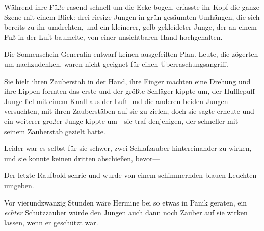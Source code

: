 Während ihre Füße rasend schnell um die Ecke bogen, erfasste ihr Kopf die ganze Szene mit einem Blick: drei riesige Jungen in grün-gesäumten Umhängen, die sich bereits zu ihr umdrehten, und ein kleinerer, gelb gekleideter Junge, der an einem Fuß in der Luft baumelte, von einer unsichtbaren Hand hochgehalten.

Die Sonnenschein-Generalin entwarf keinen ausgefeilten Plan. Leute, die zögerten um nachzudenken, waren nicht geeignet für einen Überraschungsangriff.

Sie hielt ihren Zauberstab in der Hand, ihre Finger machten eine Drehung und ihre Lippen formten das erste  und der größte Schläger kippte um, der Hufflepuff-Junge fiel mit einem Knall aus der Luft und die anderen beiden Jungen versuchten, mit ihren Zauberstäben auf sie zu zielen, doch sie sagte erneute  und ein weiterer großer Junge kippte um—sie traf denjenigen, der schneller mit seinem Zauberstab gezielt hatte.

Leider war es selbst für sie schwer, zwei Schlafzauber hintereinander zu wirken, und sie konnte keinen dritten abschießen, bevor—

Der letzte Raufbold schrie  und wurde von einem schimmernden blauen Leuchten umgeben.

Vor vierundzwanzig Stunden wäre Hermine bei so etwas in Panik geraten, ein \emph{echter} Schutzzauber würde den Jungen auch dann noch Zauber auf sie wirken lassen, wenn er geschützt war.

